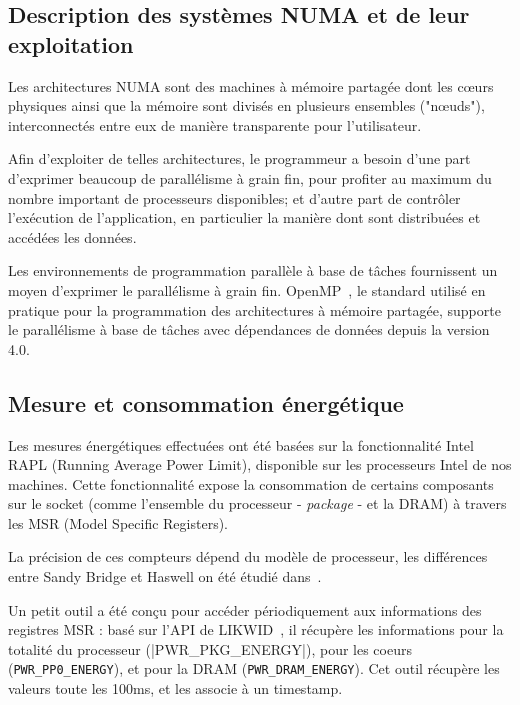 \documentclass[parallelisme]{compas2017}
\begin{document}
\subsection{Description des systèmes NUMA et de leur exploitation}


Les architectures NUMA sont des machines à mémoire partagée dont les cœurs
physiques ainsi que la mémoire sont divisés en plusieurs ensembles ("nœuds"),
interconnectés entre eux de manière transparente pour l'utilisateur.

Afin d'exploiter de telles architectures, le programmeur a besoin
d'une part d'exprimer beaucoup de parallélisme à grain fin, pour profiter au
maximum du nombre important de processeurs disponibles; et d'autre part de contrôler
l'exécution de l'application, en particulier la manière dont sont distribuées
et accédées les données.

Les environnements de programmation parallèle à base de tâches fournissent un moyen
d'exprimer le parallélisme à grain fin. OpenMP~\cite{openmp40}, le standard utilisé
en pratique pour la programmation des architectures à mémoire partagée, supporte
le parallélisme à base de tâches avec dépendances de données depuis la version 4.0.

\subsection{Mesure et consommation énergétique}

Les mesures énergétiques effectuées ont été basées sur la fonctionnalité Intel RAPL
(Running Average Power Limit), disponible sur les processeurs Intel de nos machines.
Cette fonctionnalité expose la consommation de certains composants sur le socket
(comme l'ensemble du processeur - \emph{package} - et la DRAM) à travers les 
MSR (Model Specific Registers).

La précision de ces compteurs dépend du modèle de processeur, les différences
entre Sandy Bridge et Haswell on été étudié dans~\cite{7284406,6148200}.

Un petit outil a été conçu pour accéder périodiquement aux informations des registres MSR :
basé sur l'API de LIKWID~\cite{DBLP:journals/corr/abs-1104-4874}, il récupère les
informations pour la totalité du processeur (|PWR_PKG_ENERGY|), pour les coeurs
(\verb/PWR_PP0_ENERGY/), et pour la DRAM (\verb/PWR_DRAM_ENERGY/).
Cet outil récupère les valeurs toute les 100ms, et les associe à un timestamp.


\end{document}
